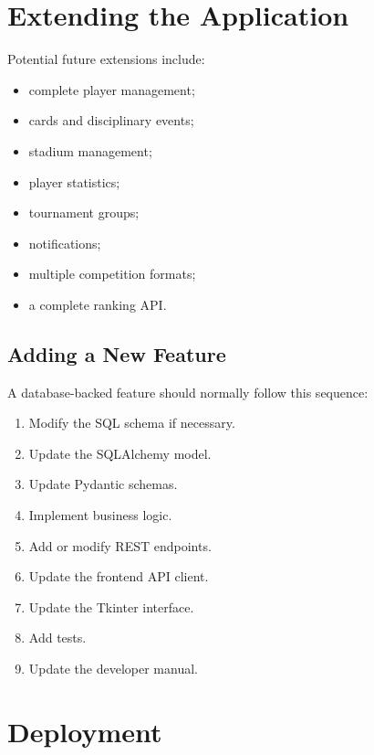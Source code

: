 \documentclass[12pt,a4paper]{article}
\begin{document}
\section{Extending the Application}

Potential future extensions include:

\begin{itemize}
    \item complete player management;
    \item cards and disciplinary events;
    \item stadium management;
    \item player statistics;
    \item tournament groups;
    \item notifications;
    \item multiple competition formats;
    \item a complete ranking API.
\end{itemize}

\subsection{Adding a New Feature}

A database-backed feature should normally follow this sequence:

\begin{enumerate}
    \item Modify the SQL schema if necessary.
    \item Update the SQLAlchemy model.
    \item Update Pydantic schemas.
    \item Implement business logic.
    \item Add or modify REST endpoints.
    \item Update the frontend API client.
    \item Update the Tkinter interface.
    \item Add tests.
    \item Update the developer manual.
\end{enumerate}


\section{Deployment}
\end{document}
